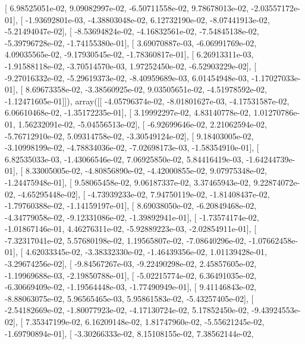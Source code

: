 \documentclass{article}
\begin{document}
       [  6.98525051e-02,   9.09082997e-02,  -6.50711558e-02,
          9.78678013e-02,  -2.03557172e-01],
       [ -1.93692801e-03,  -4.38803048e-02,   6.12732190e-02,
         -8.07441913e-02,  -5.21494047e-02],
       [ -8.53694824e-02,  -4.16832561e-02,  -7.54845138e-02,
         -5.39796728e-02,  -1.74155380e-01],
       [  3.69070887e-03,  -6.06991769e-02,   4.09035565e-02,
         -9.17930545e-02,  -1.78360817e-01],
       [  6.26913311e-03,  -1.91588118e-02,  -3.70514570e-03,
          1.97252450e-02,  -6.52903229e-02],
       [ -9.27016332e-02,  -5.29619373e-02,  -8.40959689e-03,
          6.01454948e-03,  -1.17027033e-01],
       [  8.69673358e-02,  -3.38560925e-02,   9.03505651e-02,
         -4.51978592e-02,  -1.12471605e-01]]), array([[ -4.05796374e-02,  -8.01801627e-03,  -4.17531587e-02,
          6.06610468e-02,  -1.35172235e-01],
       [  3.19992297e-02,   4.83140778e-02,   1.01270786e-01,
          1.56232091e-02,  -5.04556513e-02],
       [ -6.92699646e-02,   2.21062594e-02,  -5.76712910e-02,
          5.09314758e-02,  -3.30549124e-02],
       [  9.18403005e-02,  -3.10998199e-02,  -4.78834036e-02,
         -7.02698173e-03,  -1.58354910e-01],
       [  6.82535033e-03,  -1.43066546e-02,   7.06925850e-02,
          5.84416419e-03,  -1.64244739e-01],
       [  8.33005005e-02,  -4.80856890e-02,  -4.42000855e-02,
          9.07975348e-02,  -1.24475948e-01],
       [  9.58065458e-02,   9.06187337e-02,   3.37465943e-02,
          9.22874072e-02,  -4.65295448e-02],
       [ -4.73939233e-02,   7.94750119e-02,  -1.81408437e-02,
         -1.79760388e-02,  -1.14159197e-01],
       [  8.69038050e-02,  -6.20849468e-02,  -4.34779058e-02,
         -9.12331086e-02,  -1.39892941e-01],
       [ -1.73574174e-02,  -1.01867146e-01,   4.46276311e-02,
         -5.92889223e-03,  -2.02854911e-01],
       [ -7.32317041e-02,   5.57680198e-02,   1.19565807e-02,
         -7.08640296e-02,  -1.07662458e-01],
       [  4.62033345e-02,  -3.38332330e-02,  -1.46439356e-02,
          1.01139428e-01,  -3.29674256e-02],
       [ -9.84567267e-03,  -9.22490298e-02,   2.45857605e-02,
         -1.19969688e-03,  -2.19850788e-01],
       [ -5.02215774e-02,   6.36491035e-02,  -6.30669409e-02,
         -1.19564448e-03,  -1.77490949e-01],
       [  9.41146843e-02,  -8.88063075e-02,   5.96565465e-03,
          5.95861583e-02,  -5.43257405e-02],
       [ -2.54182669e-02,  -1.80077923e-02,  -4.17130724e-02,
          5.17852450e-02,  -9.43924553e-02],
       [  7.35347199e-02,   6.16209148e-02,   1.81747960e-02,
         -5.55621245e-02,  -1.69790894e-01],
       [ -3.30266333e-02,   8.15108155e-02,   7.38562144e-02,
\end{document}
